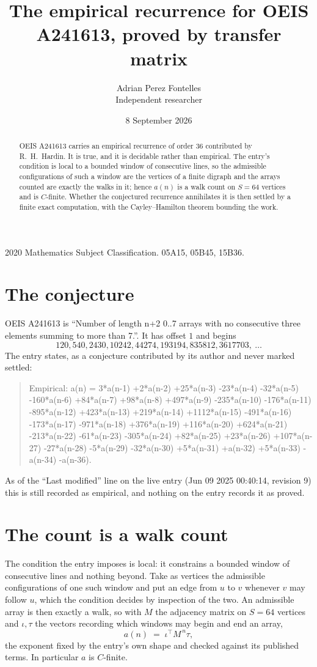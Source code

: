 \documentclass[11pt,a4paper]{article}
\title{The empirical recurrence for OEIS A241613, proved by transfer matrix}
\author{Adrian Perez Fontelles\\ \small Independent researcher}
\date{8 September 2026}
\theoremstyle{plain}
\theoremstyle{definition}
\begin{document}
\maketitle

\begin{abstract}
OEIS A241613 carries an empirical recurrence of order $36$ contributed by R.~H.~Hardin. It is
true, and it is decidable rather than empirical. The entry's condition is local to a bounded window of consecutive lines, so
the admissible configurations of such a window are the vertices of a finite digraph and the
arrays counted are exactly the walks in it; hence $a(n)$ is a walk count on $S=64$ vertices
and is $C$-finite. Whether the conjectured recurrence annihilates it is then settled by a
finite exact computation, with the Cayley--Hamilton theorem bounding the work.
\end{abstract}

\noindent\small 2020 Mathematics Subject Classification. 05A15, 05B45, 15B36.\normalsize

\section{The conjecture}

OEIS A241613 is ``Number of length n+2 0..7 arrays with no consecutive three elements summing to more than 7.''. It has offset $1$ and begins
\[
120, 540, 2430, 10242, 44274, 193194, 835812, 3617703,\ \dots
\]
The entry states, as a conjecture contributed by its author and never marked settled:
\begin{quote}
Empirical: a(n) = 3*a(n-1) +2*a(n-2) +25*a(n-3) -23*a(n-4) -32*a(n-5) -160*a(n-6) +84*a(n-7) +98*a(n-8) +497*a(n-9) -235*a(n-10) -176*a(n-11) -895*a(n-12) +423*a(n-13) +219*a(n-14) +1112*a(n-15) -491*a(n-16) -173*a(n-17) -971*a(n-18) +376*a(n-19) +116*a(n-20) +624*a(n-21) -213*a(n-22) -61*a(n-23) -305*a(n-24) +82*a(n-25) +23*a(n-26) +107*a(n-27) -27*a(n-28) -5*a(n-29) -32*a(n-30) +5*a(n-31) +a(n-32) +5*a(n-33) -a(n-34) -a(n-36).
\end{quote}
As of the ``Last modified'' line on the live entry (Jun 09 2025 00:40:14, revision 9) this is still
recorded as empirical, and nothing on the entry records it as proved.

\section{The count is a walk count}

The condition the entry imposes is local: it constrains a bounded window of consecutive lines and nothing beyond. Take as
vertices the admissible configurations of one such window and put an edge from $u$ to $v$
whenever $v$ may follow $u$, which the condition decides by inspection of the two. An
admissible array is then exactly a walk, so with $M$ the adjacency matrix on $S=64$ vertices
and $\iota,\tau$ the vectors recording which windows may begin and end an array,
\[
a(n)\;=\;\iota^{\!\top}M^{\,n}\tau ,
\]
the exponent fixed by the entry's own shape and checked against its published terms. In
particular $a$ is $C$-finite.
\end{document}
